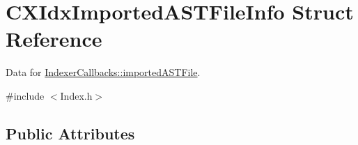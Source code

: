 \hypertarget{structCXIdxImportedASTFileInfo}{}\section{C\+X\+Idx\+Imported\+A\+S\+T\+File\+Info Struct Reference}
\label{structCXIdxImportedASTFileInfo}


Data for \mbox{\hyperlink{structIndexerCallbacks_a75672a9934f69854080bee3fbc0e3994}{Indexer\+Callbacks\+::imported\+A\+S\+T\+File}}.  




{\ttfamily \#include $<$Index.\+h$>$}

\subsection*{Public Attributes}
